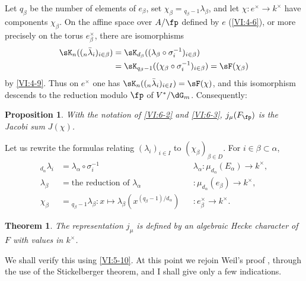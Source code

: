 \documentclass[12pt,oneside,english]{smfbook}
\newcounter{char}
\newtheorem{theorem_}[subsection]{Theorem}
\newtheorem{proposition_}[subsection]{Proposition}
\begin{document}
Let $q_\beta$ be the number of elements of $e_\beta$, set $\chi_\beta={}_{q_\beta-1}\lambda_\beta$, and let $\chi:e^\times\to k^\times$ have components $\chi_\beta$. On the affine space over $A/\fp$ defined by $e$ (\ref{VI:4-6}), or more precisely on the torus $e_\beta^\times$, there are isomorphisms
\[
\begin{split}
  \sK_n(({}_n\bar\lambda_i)_{i\in\beta})
  &=\sK_{d_\beta}
      ((\lambda_\beta\circ\sigma_i^{-1})_{i\in\beta})\\
  &=\sK_{q_\beta-1}
      ((\chi_\beta\circ\sigma_i^{-1})_{i\in\beta})
   =\sF(\chi_\beta)
\end{split}
\]
by \ref{VI:4-9}. Thus on $e^\times$ one has $\sK_n(({}_n\bar\lambda_i)_{i\in I})=\sF(\chi)$, and this isomorphism descends to the reduction modulo $\fp$ of $V^\ast/\dG_m$. Consequently:

\begin{proposition_}\label{VI:6-4}
With the notation of \ref{VI:6-2} and \ref{VI:6-3}, $j_\mu(F_\fp)$ is the Jacobi sum $J(\chi)$.
\end{proposition_}

Let us rewrite the formulas relating $(\lambda_i)_{i\in I}$ to $(\chi_\beta)_{\beta\in D}$. For $i\in\beta\subset\alpha$,
\begin{align*}
  {}_{d_\alpha}\lambda_i
    &=\lambda_\alpha\circ\sigma_i^{-1}
    &&\lambda_\alpha:\mu_{d_\alpha}(E_\alpha)\to k^\times,\\
  \lambda_\beta
    &=\text{the reduction of $\lambda_\alpha$}
    &&:\mu_{d_\alpha}(e_\beta)\to k^\times,\\
  \chi_\beta
    &={}_{q_\beta-1}\lambda_\beta:
      x\longmapsto\lambda_\beta(x^{(q_\beta-1)/d_\alpha})
    &&:e_\beta^\times\to k^\times.
\end{align*}

\begin{theorem_}\label{VI:6-5}
The representation $j_\mu$ is defined by an algebraic Hecke character of $F$ with values in $k^\times$.
\end{theorem_}

We shall verify this using \ref{VI:5-10}. At this point we rejoin Weil's proof \cite{we52,we74-2}, through the use of the Stickelberger theorem, and I shall give only a few indications.

\subsection{}\label{VI:6-6}
\end{document}
